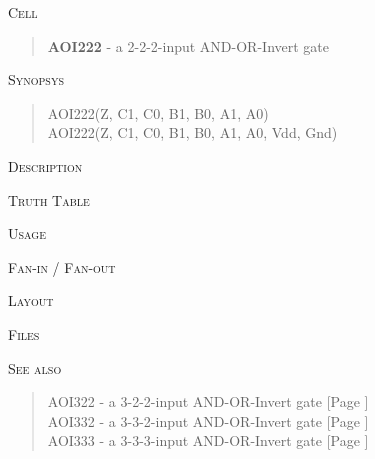 
\label{AOI222}
\textsc{Cell}
\begin{quote}
    \textbf{AOI222} - a 2-2-2-input AND-OR-Invert gate
\end{quote}

\textsc{Synopsys}
\begin{quote}
    AOI222(Z, C1, C0, B1, B0, A1, A0) \\
    AOI222(Z, C1, C0, B1, B0, A1, A0, Vdd, Gnd)
\end{quote}

\textsc{Description}

%

\textsc{Truth Table}


\textsc{Usage}

\textsc{Fan-in / Fan-out}

\textsc{Layout}

\textsc{Files}

\textsc{See also}
\begin{quote}
    AOI322 - a 3-2-2-input AND-OR-Invert gate [Page \pageref{AOI322}] \\
    AOI332 - a 3-3-2-input AND-OR-Invert gate [Page \pageref{AOI332}] \\
    AOI333 - a 3-3-3-input AND-OR-Invert gate [Page \pageref{AOI333}]
\end{quote}

